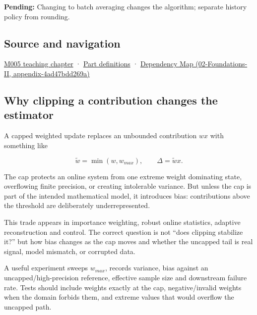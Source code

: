 \textbf{Pending:} Changing to batch averaging changes the algorithm; separate history policy from rounding.

\subsection{Source and navigation}\label{source-and-navigation}

\href{Continuous\%20Notes/Computing\%20Foundations\%20-\%20From\%20Bits\%20to\%20C++\%20and\%20Systems\%20APIs\#When\%20arithmetic\%20meets\%20uncertainty}{M005 teaching chapter} · \hyperref[appendix-fd090d982a15]{Part definitions} · \href{}{Dependency Map (02-Foundations-II, appendix-4ad47bdd269a)}

\subsection{Why clipping a contribution changes the estimator}\label{why-clipping-a-contribution-changes-the-estimator}

A capped weighted update replaces an unbounded contribution \(w x\) with something like

\[
\tilde w = \min(w,w_{max}),
\qquad
\Delta = \tilde w x.
\]

The cap protects an online system from one extreme weight dominating state, overflowing finite precision, or creating intolerable variance. But unless the cap is part of the intended mathematical model, it introduces bias: contributions above the threshold are deliberately underrepresented.

This trade appears in importance weighting, robust online statistics, adaptive reconstruction and control. The correct question is not ``does clipping stabilize it?'' but how bias changes as the cap moves and whether the uncapped tail is real signal, model mismatch, or corrupted data.

A useful experiment sweeps \(w_{max}\), records variance, bias against an uncapped/high-precision reference, effective sample size and downstream failure rate. Tests should include weights exactly at the cap, negative/invalid weights when the domain forbids them, and extreme values that would overflow the uncapped path.

